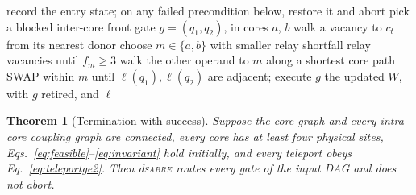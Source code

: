 \documentclass[journal]{IEEEtran}
\newcommand{\dSABRE}{d\textsc{sabre}}
\newtheorem{theorem}{Theorem}
\begin{document}

\begin{algorithm}[t]
\caption{\textsc{Recover}$(W,\ell)$: the guaranteed transaction of Section~\ref{sec:recovery}, which retires one blocked inter-core gate and returns with Eq.~\eqref{eq:invariant} restored.}
\label{alg:recover}
\small
\begin{algorithmic}[1]
\STATE record the entry state; on any failed precondition below, restore it and abort
\STATE pick a blocked inter-core front gate $g=(q_1,q_2)$, in cores $a$, $b$
\label{ln:res1}
  \STATE walk a vacancy to $c_t$ from its nearest donor 
\ENDWHILE
\STATE choose $m\in\{a,b\}$ with smaller relay shortfall \label{ln:meet}
\STATE relay vacancies until $f_m\ge3$\label{ln:top}
\STATE walk the other operand to $m$ along a shortest core path
\STATE SWAP within $m$ until $\ell(q_1),\ell(q_2)$ are adjacent; execute $g$
\RETURN the updated $W$, with $g$ retired, and $\ell$
\end{algorithmic}
\end{algorithm}

\begin{theorem}[Termination with success]
\label{thm:completion}
Suppose the core graph and every intra-core coupling graph are connected, every core has at least four physical sites, Eqs.~\eqref{eq:feasible}--\eqref{eq:invariant} hold initially, and every teleport obeys Eq.~\eqref{eq:teleportge2}. Then \dSABRE{} routes every gate of the input DAG and does not abort.
\end{theorem}
\end{document}
